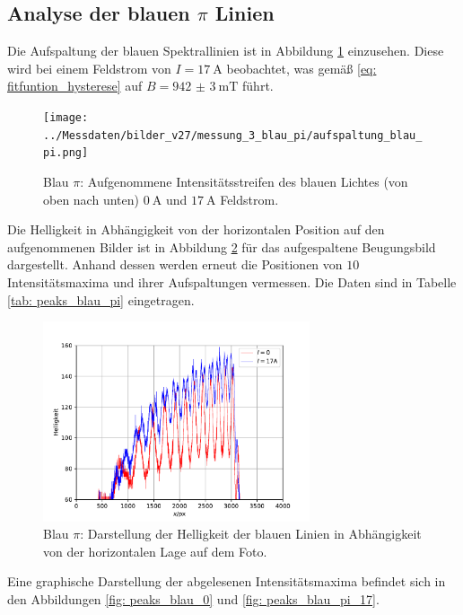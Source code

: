 \subsection{Analyse der blauen $\pi$ Linien}
Die Aufspaltung der blauen Spektrallinien ist in Abbildung \ref{fig: aufspaltung_blau_pi} einzusehen. Diese wird bei einem
Feldstrom von $I = \SI{17}{\ampere}$ beobachtet, was gemäß \eqref{eq: fitfuntion_hysterese} auf $B = \SI{942(3)}{\milli\tesla}$ führt.
\begin{figure}
  \centering
  \texttt{[image: ../Messdaten/bilder\_v27/messung\_3\_blau\_pi/aufspaltung\_blau\_pi.png]}
  \caption{Blau $\pi$: Aufgenommene Intensitätsstreifen des blauen Lichtes (von oben nach unten) $\SI{0}{\ampere}$ und $\SI{17}{\ampere}$ Feldstrom.}
  \label{fig: aufspaltung_blau_pi}
\end{figure}
Die Helligkeit in Abhängigkeit von der horizontalen Position auf den aufgenommenen Bilder ist in Abbildung \ref{fig: blau_intensität_pi} für das aufgespaltene Beugungsbild dargestellt.
Anhand dessen werden erneut die Positionen von $10$ Intensitätsmaxima und ihrer Aufspaltungen
vermessen. Die Daten sind in Tabelle \ref{tab: peaks_blau_pi} eingetragen.
\begin{figure}
  \centering
  \includegraphics[width = 0.7\textwidth]{../Messdaten/plots/blau_pi_intensitaet.pdf}
  \caption{Blau $\pi$: Darstellung der Helligkeit der blauen Linien in Abhängigkeit von der horizontalen Lage auf dem Foto.}
  \label{fig: blau_intensität_pi}
\end{figure}

Eine graphische Darstellung der abgelesenen Intensitätsmaxima befindet sich in den Abbildungen \ref{fig: peaks_blau_0} und \ref{fig: peaks_blau_pi_17}.
